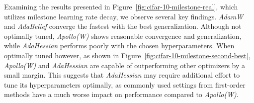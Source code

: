 Examining the results presented in Figure~\ref{fig:cifar-10-milestone-real}, which utilizes milestone
learning rate decay, we observe several key findings. \emph{AdamW} and \emph{AdaBelief} converge the fastest with the best generalization.
Although not optimally tuned, \emph{Apollo(W)} shows reasonable convergence and generalization,
while \emph{AdaHessian} performs poorly with the chosen hyperparameters.
When optimally tuned however, as shown in Figure~\ref{fig:cifar-10-milestone-second-best}, \emph{Apollo(W)} and \emph{AdaHessian} are capable of 
outperforming other optimizers by a small margin. This suggests that \emph{AdaHessian} may require additional effort to tune its hyperparameters optimally,
as commonly used settings from first-order methods have a much worse impact on performance compared to \emph{Apollo(W)}.





